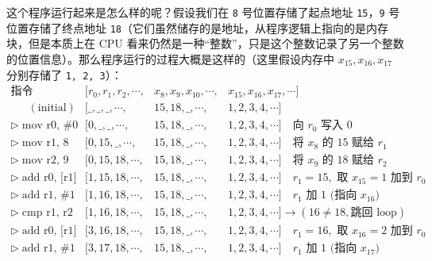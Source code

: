 这个程序运行起来是怎么样的呢？假设我们在 \texttt{8} 号位置存储了起点地址 \texttt{15}，\texttt{9} 号位置存储了终点地址 \texttt{18}（它们虽然储存的是地址，从程序逻辑上指向的是内存块，但是本质上在 CPU 看来仍然是一种“整数”，只是这个整数记录了另一个整数的位置信息）。那么程序运行的过程大概是这样的（这里假设内存中 $x_{15}, x_{16}, x_{17}$ 分别存储了 \texttt{1, 2, 3}）：
\[
    \begin{array}{l|lll}
        \text{指令}                                    & [r_0, r_1, r_2, \cdots, & x_8, x_9, x_{10}, \cdots, & x_{15}, x_{16}, x_{17}, \cdots]                                    \\
        \hline
        \phantom{\triangleright} \; (\text{initial}) & [\_, \_, \_, \cdots,    & 15, 18, \_, \cdots,       & 1, 2, 3, 4, \cdots]                                                \\
        \triangleright \; \text{mov r0, \#0}         & [0, \_, \_, \cdots,     & 15, 18, \_, \cdots,       & 1, 2, 3, 4, \cdots] \quad \text{向 $r_0$ 写入 0}                      \\
        \triangleright \; \text{mov r1, 8}           & [0, 15, \_, \cdots,     & 15, 18, \_, \cdots,       & 1, 2, 3, 4, \cdots] \quad \text{将 $x_8$ 的 15 赋给 $r_1$}             \\
        \triangleright \; \text{mov r2, 9}           & [0, 15, 18, \cdots,     & 15, 18, \_, \cdots,       & 1, 2, 3, 4, \cdots] \quad \text{将 $x_9$ 的 18 赋给 $r_2$}             \\
        \triangleright \; \text{add r0, [r1]}        & [1, 15, 18, \cdots,     & 15, 18, \_, \cdots,       & 1, 2, 3, 4, \cdots] \quad \text{$r_1 = 15,$ 取 $x_{15}=1$ 加到 $r_0$} \\
        \triangleright \; \text{add r1, \#1}         & [1, 16, 18, \cdots,     & 15, 18, \_, \cdots,       & 1, 2, 3, 4, \cdots] \quad \text{$r_1$ 加 1 (指向 $x_{16}$)}           \\
        \triangleright \; \text{cmp r1, r2}          & [1, 16, 18, \cdots,     & 15, 18, \_, \cdots,       & 1, 2, 3, 4, \cdots] \to (16 \neq 18, \text{跳回 loop})               \\
        \triangleright \; \text{add r0, [r1]}        & [3, 16, 18, \cdots,     & 15, 18, \_, \cdots,       & 1, 2, 3, 4, \cdots] \quad \text{$r_1 = 16,$ 取 $x_{16}=2$ 加到 $r_0$} \\
        \triangleright \; \text{add r1, \#1}         & [3, 17, 18, \cdots,     & 15, 18, \_, \cdots,       & 1, 2, 3, 4, \cdots] \quad \text{$r_1$ 加 1 (指向 $x_{17}$)}           \\

\end{array}\]

